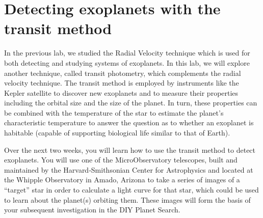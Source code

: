 \chapter{Detecting exoplanets with the transit method}








In the previous lab, we studied the Radial Velocity technique which is
used for both detecting and studying systems of exoplanets. In this lab,
we will explore another technique, called transit photometry, which
complements the radial velocity technique. The transit method is
employed by instruments like the Kepler satellite to discover new
exoplanets and to measure their properties including the orbital size
and the size of the planet. In turn, these properties can be combined
with the temperature of the star to estimate the planet’s characteristic
temperature to answer the question as to whether an exoplanet is
habitable (capable of supporting biological life similar to that of Earth).

Over the next two weeks, you will learn how to use the transit method to detect exoplanets. You will use    one    of    the    MicroObservatory    telescopes,    built    and    maintained    by    the    Harvard‐Smithsonian    Center    for    Astrophysics    and    located    at    the    Whipple    Observatory    in    Amado,    Arizona    to    take    a    series    of    images    of    a    ``target''    star in order to calculate a light curve for that star, which could be used to learn about the planet(s) orbiting them.    These    images    will    form    the    basis    of    your    subsequent    investigation in the DIY Planet Search.

